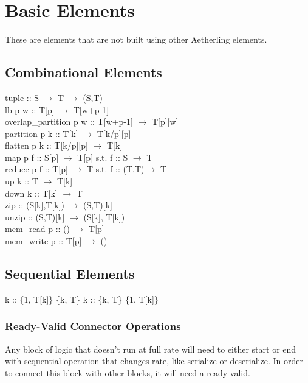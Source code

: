 \documentclass[11pt,fleqn]{article}
\numberwithin{equation}{subsection}
\begin{document}
\section{Basic Elements}
These are elements that are not built using other Aetherling elements.

\subsection{Combinational Elements}

\begin{adjustwidth}{2.5 em}{0 pt}
    tuple :: S $\rightarrow$ T $\rightarrow$ (S,T) \\
    lb p w :: T[p] $\rightarrow$ T[w+p-1] \\
    overlap\_partition p w :: T[w+p-1] $\rightarrow$ T[p][w] \\
    partition p k :: T[k] $\rightarrow$ T[k/p][p] \\
    flatten p k :: T[k/p][p] $\rightarrow$ T[k] \\
    map p f :: S[p] $\rightarrow$ T[p]   \qquad s.t. f :: S $\rightarrow$ T \\
    reduce p f :: T[p] $\rightarrow$ T \qquad s.t. f :: (T,T)$\rightarrow$ T \\
    up k :: T $\rightarrow$ T[k] \\
    down k :: T[k] $\rightarrow$ T \\
    zip :: (S[k],T[k]) $\rightarrow$ (S,T)[k] \\
    unzip :: (S,T)[k] $\rightarrow$ (S[k], T[k]) \\
    mem\_read p :: () $\rightarrow$ T[p] \\
    mem\_write p :: T[p] $\rightarrow$ ()
\end{adjustwidth}

\subsection{Sequential Elements}

\begin{adjustwidth}{2.5 em}{0 pt}
    \;k :: \{1, T[k]\} \rightarrow \{k, T\}
    \;k :: \{k, T\} \rightarrow \{1, T[k]\}
\end{adjustwidth}

\subsubsection{Ready-Valid Connector Operations}
Any block of logic that doesn't run at full rate will need to either start or 
end with sequential operation that changes rate, like serialize or deserialize.
In order to connect this block with other blocks, it will need a ready valid.
\end{document}
